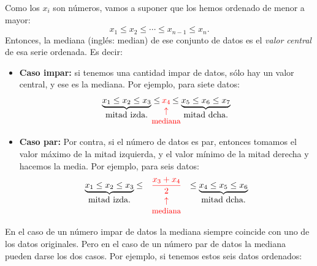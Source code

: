 \begin{itemize}
        Como los $x_i$ son números, vamos a suponer que los hemos ordenado de menor a mayor:
        \[x_1\leq x_2\leq\cdots\leq x_{n-1}\leq x_n.\]
        Entonces, la {\sf mediana} (inglés: median) de ese conjunto de datos es el {\em valor central} de esa serie ordenada. Es decir:
        \begin{itemize}
            \item[]{\bf Caso impar:} si tenemos una cantidad impar de datos, sólo hay un valor central, y ese es la mediana. Por ejemplo, para siete datos:
                \[
                \begin{array}{rcl}
                \underbrace{x_1\leq x_2\leq x_3}_{\mbox{mitad izda.}}\leq &\hspace{-7mm}\textcolor{red}{x_4}&\hspace{-7mm}\leq
                \underbrace{x_5\leq x_6\leq x_7}_{\mbox{mitad dcha.}}\\[-5mm]
                &\hspace{-7mm}\textcolor{red}{\uparrow}&\\
                &\hspace{-7mm}\textcolor{red}{\mbox{\small mediana}}&
                \end{array}
                \]
            \item[]{\bf Caso par:} Por contra, si el número de datos es par, entonces tomamos el valor máximo de la mitad izquierda, y el valor mínimo de la mitad derecha y hacemos la media. Por ejemplo, para seis datos:
                \[
                \begin{array}{rcl}
                \underbrace{x_1\leq x_2\leq x_3}_{\mbox{mitad izda.}}\leq &\hspace{0mm}\textcolor{red}{\dfrac{x_3+x_4}{2}}&\hspace{0mm}\leq
                \underbrace{x_4\leq x_5\leq x_6}_{\mbox{mitad dcha.}}\\[-3mm]
                &\hspace{0mm}\textcolor{red}{\uparrow}&\\
                &\hspace{0mm}\textcolor{red}{\mbox{\small mediana}}&
                \end{array}
                \]
        \end{itemize}
        En el caso de un número impar de datos la mediana siempre coincide con uno de los datos originales. Pero en el caso de un número par de datos la mediana pueden darse los dos casos. Por ejemplo, si tenemos estos seis datos ordenados:

\end{itemize}
